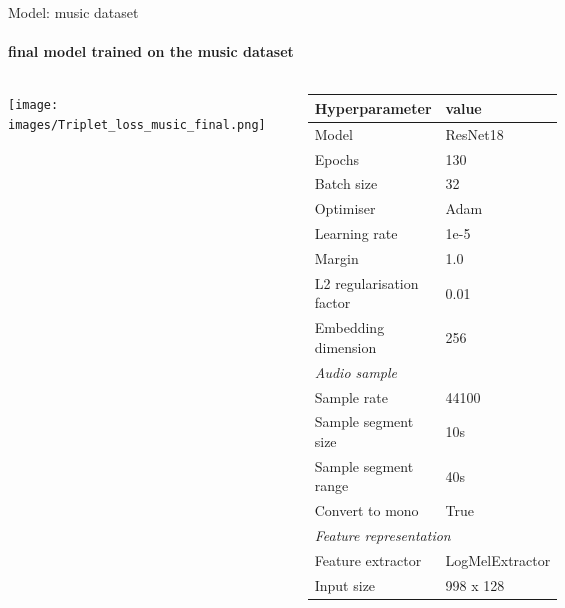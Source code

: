 \documentclass[aspectratio=169, professionalfonts]{beamer}
\begin{document}
\begin{frame}{Model: music dataset}
    \framesubtitle{final model trained on the music dataset}
    
    \begin{columns}
        \centering
        \texttt{[image: images/Triplet\_loss\_music\_final.png]}
    
        \begin{table}[htbp]
            \centering
        	\label{tab:Hyperparameters-Music}
        	\tiny
            \begin{tabular}{l|l}
                \toprule
                \textbf{Hyperparameter} & \textbf{value} \\ 
                \midrule[1pt]
                Model & ResNet18 \\ 
                \hline
                Epochs & 130 \\ 
                \hline
                Batch size & 32 \\ 
                \hline
                Optimiser & Adam \\ 
                \hline
                Learning rate & 1e-5 \\
                \hline
                Margin & 1.0 \\
                \hline
                L2 regularisation factor & 0.01 \\
                \hline
                Embedding dimension & 256 \\
                \midrule[1pt]
                \multicolumn{2}{l}{\textit{Audio sample}} \\
                \midrule[1pt]
                Sample rate & 44100 \\ 
                \hline
                Sample segment size & 10s \\
                \hline
                Sample segment range & 40s \\
                \hline
                Convert to mono & True \\
                \midrule[1pt]
                \multicolumn{2}{l}{\textit{Feature representation}} \\
                \midrule[1pt]
                Feature extractor & LogMelExtractor \\ 
                \hline
                Input size & 998 x 128 \\
                \bottomrule
            \end{tabular}
        \end{table}
    \end{columns}
    

\end{frame}
\end{document}

